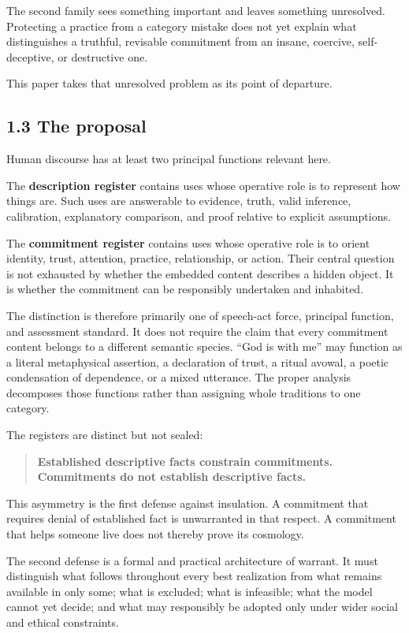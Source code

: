 \documentclass[
  11pt,
]{article}
\begin{document}
The second family sees something important and leaves something
unresolved. Protecting a practice from a category mistake does not yet
explain what distinguishes a truthful, revisable commitment from an
insane, coercive, self-deceptive, or destructive one.

This paper takes that unresolved problem as its point of departure.

\subsection{1.3 The proposal}\label{the-proposal}

Human discourse has at least two principal functions relevant here.

The \textbf{description register} contains uses whose operative role is
to represent how things are. Such uses are answerable to evidence,
truth, valid inference, calibration, explanatory comparison, and proof
relative to explicit assumptions.

The \textbf{commitment register} contains uses whose operative role is
to orient identity, trust, attention, practice, relationship, or action.
Their central question is not exhausted by whether the embedded content
describes a hidden object. It is whether the commitment can be
responsibly undertaken and inhabited.

The distinction is therefore primarily one of speech-act force,
principal function, and assessment standard. It does not require the
claim that every commitment content belongs to a different semantic
species. ``God is with me'' may function as a literal metaphysical
assertion, a declaration of trust, a ritual avowal, a poetic
condensation of dependence, or a mixed utterance. The proper analysis
decomposes those functions rather than assigning whole traditions to one
category.

The registers are distinct but not sealed:

\begin{quote}
\textbf{Established descriptive facts constrain commitments. Commitments
do not establish descriptive facts.}
\end{quote}

This asymmetry is the first defense against insulation. A commitment
that requires denial of established fact is unwarranted in that respect.
A commitment that helps someone live does not thereby prove its
cosmology.

The second defense is a formal and practical architecture of warrant. It
must distinguish what follows throughout every best realization from
what remains available in only some; what is excluded; what is
infeasible; what the model cannot yet decide; and what may responsibly
be adopted only under wider social and ethical constraints.
\end{document}

